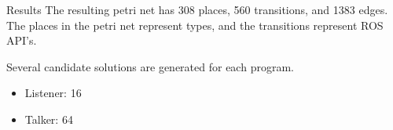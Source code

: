 \documentclass[final]{beamer}
\newlength{\onecolwid}
\begin{document}
\begin{frame}[t]
\begin{columns}[t]
\begin{column}{\onecolwid}


\begin{block}{Results}
The resulting petri net has 308 places, 560 transitions, and 1383 edges. The places in the petri net represent types, and the transitions represent ROS API's.

Several candidate solutions are generated for each program.
\begin{itemize}
\item Listener: 16
\item Talker: 64
\end{itemize}


\end{block}






\end{column}
\end{columns}
\end{frame}
\end{document}
